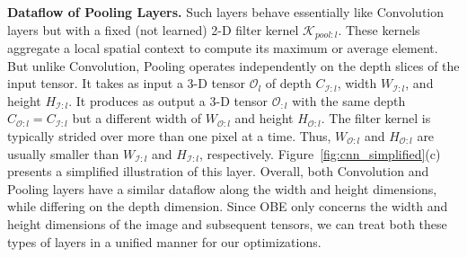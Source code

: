 
\vspace{2mm}
\noindent \textbf{Dataflow of Pooling Layers.} 
Such layers behave essentially like Convolution layers but with a fixed (not learned) 2-D filter kernel $\mathcal{K}_{pool:l}$. These kernels aggregate a local spatial context to compute its maximum or average element. But unlike Convolution, Pooling operates independently on the depth slices of the input tensor.
It takes as input a 3-D tensor $\mathcal{O}_{l}$ of depth $C_{\mathcal{I}:l}$, width $W_{\mathcal{I}:l}$, and height $H_{\mathcal{I}:l}$. It produces as output a 3-D tensor $\mathcal{O}_{:l}$ with the same depth $C_{\mathcal{O}:l}=C_{\mathcal{I}:l}$ but a different width of $W_{\mathcal{O}:l}$ and height $H_{\mathcal{O}:l}$. The filter kernel is typically strided over more than one pixel at a time. Thus, $W_{\mathcal{O}:l}$ and $H_{\mathcal{O}:l}$ are usually smaller than $W_{\mathcal{I}:l}$ and $H_{\mathcal{I}:l}$, respectively. Figure~\ref{fig:cnn_simplified}(c) presents a simplified illustration of this layer.
Overall, both Convolution and Pooling layers have a similar dataflow along the width and height dimensions, while differing on the depth dimension. Since OBE only concerns the width and height dimensions of the image and subsequent tensors, we can treat both these types of layers in a unified manner for our optimizations.




